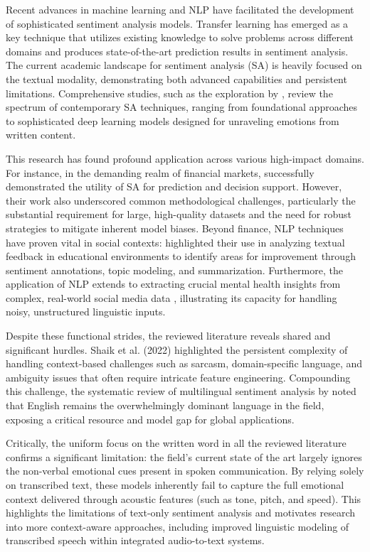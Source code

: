 \noindent Recent advances in machine learning and NLP have facilitated the development of sophisticated sentiment analysis models. Transfer learning has emerged as a key technique that utilizes existing knowledge to solve problems across different domains and produces state-of-the-art prediction results in sentiment analysis. The current academic landscape for sentiment analysis (SA) is heavily focused on the textual modality, demonstrating both advanced capabilities and persistent limitations. Comprehensive studies, such as the exploration by \cite{chinedu2023unraveling}, review the spectrum of contemporary SA techniques, ranging from foundational approaches to sophisticated deep learning models designed for unraveling emotions from written content.

\noindent This research has found profound application across various high-impact domains. For instance, in the demanding realm of financial markets, \cite{Jawale_Jawale_Ingale_Shetty_2023} successfully demonstrated the utility of SA for prediction and decision support. However, their work also underscored common methodological challenges, particularly the substantial requirement for large, high-quality datasets and the need for robust strategies to mitigate inherent model biases. Beyond finance, NLP techniques have proven vital in social contexts: \cite{9781308} highlighted their use in analyzing textual feedback in educational environments to identify areas for improvement through sentiment annotations, topic modeling, and summarization. Furthermore, the application of NLP extends to extracting crucial mental health insights from complex, real-world social media data \cite{10.2196/68720}, illustrating its capacity for handling noisy, unstructured linguistic inputs.

\noindent Despite these functional strides, the reviewed literature reveals shared and significant hurdles. Shaik et al. (2022) highlighted the persistent complexity of handling context-based challenges such as sarcasm, domain-specific language, and ambiguity issues that often require intricate feature engineering. Compounding this challenge, the systematic review of multilingual sentiment analysis by \cite{Abdullah_Rusli_2021} noted that English remains the overwhelmingly dominant language in the field, exposing a critical resource and model gap for global applications. 

\noindent Critically, the uniform focus on the written word in all the reviewed literature confirms a significant limitation: the field's current state of the art largely ignores the non-verbal emotional cues present in spoken communication. By relying solely on transcribed text, these models inherently fail to capture the full emotional context delivered through acoustic features (such as tone, pitch, and speed). This highlights the limitations of text-only sentiment analysis and motivates research into more context-aware approaches, including improved linguistic modeling of transcribed speech within integrated audio-to-text systems.


